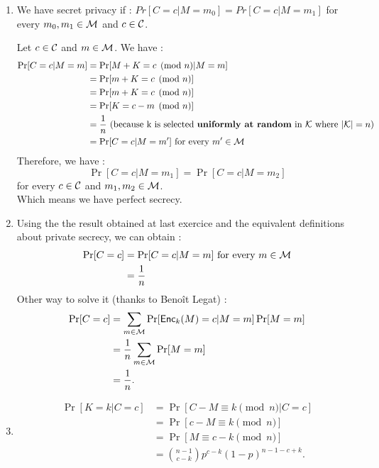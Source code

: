 \begin{solution}
  \begin{enumerate}
    \item
      We have secret privacy if : $Pr[C = c | M = m_0] = Pr[C = c | M = m_1] $ for every $m_0, m_1 \in \mathcal{M}$ and $c \in \mathcal{C}$.
      
      Let $c \in \mathcal{C}$ and $m\in \mathcal{M}$.
      We have :
      \begin{align*}
        \Pr[C = c | M = m]
        & = \Pr[M + K = c \pmod{n} | M = m]\\
        & = \Pr[m + K = c \pmod{n}]\\
        & = \Pr[m + K = c \pmod{n}]\\
        & = \Pr[K = c - m \pmod{n}]\\
        & = \frac{1}{n} \text{ (because k is selected \textbf{uniformly at random} in } \mathcal{K} \text{ where } |\mathcal{K}| = n )\\
        & = \Pr[C = c | M = m'] \text{ for every } m' \in \mathcal{M}
      \end{align*}
      Therefore, we have :
      \[
        \Pr[C = c | M = m_1] = \Pr[C = c | M = m_2]
      \]
      for every $c \in \mathcal{C}$ and $m_1,m_2 \in \mathcal{M}$. \\
      Which means we have perfect secrecy.
    \item
        Using the the result obtained at last exercice and the equivalent definitions about private secrecy, we can obtain :
      \begin{align*}
          \Pr[C = c]  & = \Pr[C = c | M = m] \text{ for every } m \in \mathcal{M} \\
          & = \frac{1}{n}
      \end{align*}
      Other way to solve it (thanks to Benoît Legat) : 
      \begin{align*}
        \Pr[C = c]
        & = \sum_{m \in \mathcal{M}} \Pr[\operatorname{\mathsf{Enc}}_k(M) = c | M = m] \Pr[M = m]\\
        & = \frac{1}{n} \sum_{m \in \mathcal{M}} \Pr[M = m]\\
        & = \frac{1}{n}.
      \end{align*}
    \item
      \begin{align*}
        \Pr[K = k | C = c]
        & = \Pr[C - M \equiv k \pmod{n} | C = c]\\
        & = \Pr[c - M \equiv k \pmod{n}]\\
        & = \Pr[M \equiv c - k \pmod{n}]\\
        & = {n-1 \choose c-k} p^{c-k} (1-p)^{n-1-c+k}.
      \end{align*}
  \end{enumerate}
\end{solution}


